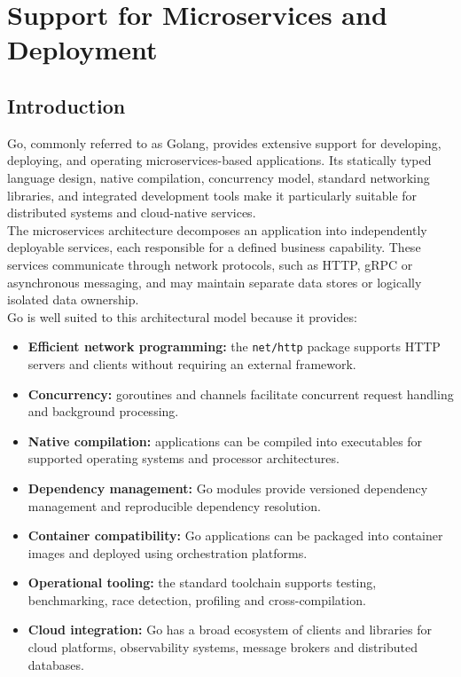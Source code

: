 \section{Support for Microservices and Deployment}

\subsection{Introduction}

Go, commonly referred to as Golang, provides extensive support for developing, deploying, and operating microservices-based applications. Its statically typed language design, native compilation, concurrency model, standard networking libraries, and integrated development tools make it particularly suitable for distributed systems and cloud-native services.\\

The microservices architecture decomposes an application into independently deployable services, each responsible for a defined business capability. These services communicate through network protocols, such as HTTP, gRPC or asynchronous messaging, and may maintain separate data stores or logically isolated data ownership.\\

Go is well suited to this architectural model because it provides:

\begin{itemize}
    \item \textbf{Efficient network programming:} the \texttt{net/http} package supports HTTP servers and clients without requiring an external framework.
    \item \textbf{Concurrency:} goroutines and channels facilitate concurrent request handling and background processing.
    \item \textbf{Native compilation:} applications can be compiled into executables for supported operating systems and processor architectures.
    \item \textbf{Dependency management:} Go modules provide versioned dependency management and reproducible dependency resolution.
    \item \textbf{Container compatibility:} Go applications can be packaged into container images and deployed using orchestration platforms.
    \item \textbf{Operational tooling:} the standard toolchain supports testing, benchmarking, race detection, profiling and cross-compilation.
    \item \textbf{Cloud integration:} Go has a broad ecosystem of clients and libraries for cloud platforms, observability systems, message brokers and distributed databases.
\end{itemize}

